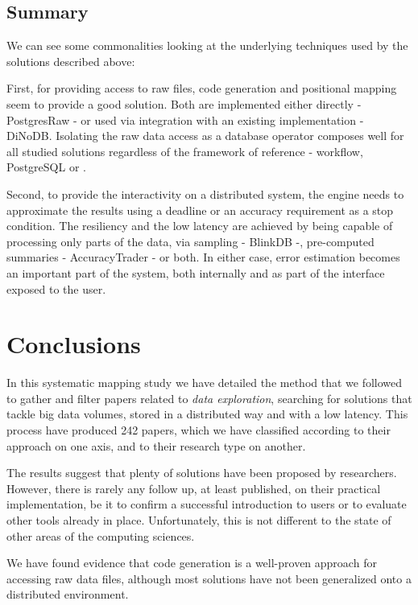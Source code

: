 \subsection{Summary}
We can see some commonalities looking at the underlying techniques used by the 
solutions described above:

First, for providing access to raw files, code generation and positional 
mapping seem to provide a good solution. Both are implemented either directly - 
PostgresRaw - or used via integration with an existing implementation - DiNoDB. 
Isolating the raw data access as a database operator composes well for all 
studied solutions regardless of the framework of reference - workflow, 
PostgreSQL or \scidb.

Second, to provide the interactivity on a distributed system, the engine 
needs to approximate the results using a deadline or an accuracy requirement as 
a stop condition. The resiliency and the low latency are achieved by 
being capable of processing only parts of the data, via sampling - BlinkDB -, 
pre-computed summaries - AccuracyTrader - or both. In either case, error 
estimation becomes an important part of the system, both internally and as 
part of the interface exposed to the user.

\section{Conclusions}
\label{sec:conclusions}
In this systematic mapping study we have detailed the method that we followed
to gather and filter papers related to \emph{data exploration}, searching
for solutions that tackle big data volumes, stored in a distributed way and with
a low latency. This process have produced 242 papers, which we have classified
according to their approach\cite{Idreos2015} on one axis, and to their research
type\cite{Wieringa2006} on another.

The results suggest that  plenty of solutions have been proposed by researchers.
However, there is rarely any follow up, at least published, on their
practical implementation, be it to confirm a successful introduction to users
or to evaluate other tools already in place.
Unfortunately, this is not different to the state of other areas of the computing sciences.

We have found evidence that code generation is a well-proven approach for
accessing raw data files, although most solutions have not been generalized
onto a distributed environment.

